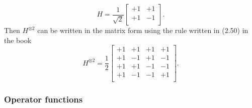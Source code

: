 \documentclass[a4paper,12pt]{article}
\begin{document}
    \begin{equation}
        H = \frac{1}{\sqrt{2}}
        \begin{bmatrix}
            +1 & +1\\
            +1 & -1\\
        \end{bmatrix} \textrm{.}
    \end{equation}
    Then $H^{\otimes 2}$ can be written in the matrix form using the rule written in (2.50) in the book
    \begin{equation}
        H^{\otimes 2} = \frac{1}{2}
        \begin{bmatrix}
            +1 & +1 & +1 & +1\\
            +1 & -1 & +1 & -1\\
            +1 & +1 & -1 & -1\\
            +1 & -1 & -1 & +1\\
        \end{bmatrix} \textrm{.}
    \end{equation}

    \subsubsection{Operator functions}
\end{document}
